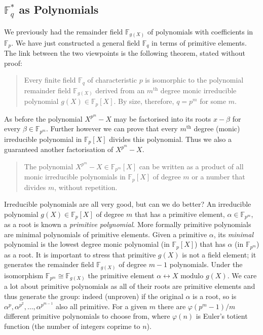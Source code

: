 \documentclass[twocolumn]{revtex4-2}
\begin{document}
\subsection{$\mathbb{F}_q^*$ as Polynomials}
We previously had the remainder field $\mathbb{F}_{g(X)}$ of polynomials with coefficients in $\mathbb{F}_p$. We have just constructed a general field $\mathbb{F}_q$ in terms of primitive elements.
The link between the two viewpoints is the following theorem, stated without proof:
\begin{quote}
Every finite field $\mathbb{F}_q$ of characteristic $p$ is isomorphic to the polynomial remainder field $\mathbb{F}_{g(X)}$ derived from an $m^{\text{th}}$ degree monic irreducible polynomial $g(X) \in \mathbb{F}_p[X]$.
By size, therefore, $q = p^m$ for some $m$.
\end{quote}
As before the polynomial $X^{p^m} - X$ may be factorised into its roots $x-\beta$ for every $\beta \in \mathbb{F}_{p^m}$. 
Further however we can prove that every $m^{\text{th}}$ degree (monic) irreducible polynomial in $\mathbb{F}_p[X]$ divides this polynomial. Thus we also a guaranteed another factorisation of $X^{p^m}-X$.
\begin{quote}
The polynomial $X^{p^m}-X \in \mathbb{F}_{p^m}[X]$ can be written as a product of all monic irreducible polynomials in $\mathbb{F}_p[X]$ of degree $m$ or a number that divides $m$, without repetition.
\end{quote}
Irreducible polynomials are all very good, but can we do better? An irreducible polynomial $g(X) \in \mathbb{F}_p[X]$ of degree $m$ that has a primitive element, $\alpha \in \mathbb{F}_{p^m}$, as a root is known a \emph{primitive polynomial}.
More formally primitive polynomials are minimal polynomials of primitive elements. Given a primitive $\alpha$, its \emph{minimal} polynomial is the lowest degree monic polynomial (in $\mathbb{F}_p[X]$) that has $\alpha$ (in $\mathbb{F}_{p^m}$) as a root.
It is important to stress that primitive $g(X)$ is not a field element; it generates the remainder field $\mathbb{F}_{g(X)}$ of degree $m-1$ polynomials. Under the isomorphism $\mathbb{F}_{p^m} \cong \mathbb{F}_{g(X)}$ the primitive element $\alpha \longleftrightarrow X \text{ modulo }g(X)$.
We care a lot about primitive polynomials as all of their roots are primitive elements and thus generate the group: indeed (unproven) if the original $\alpha$ is a root, so is $\alpha^p, \alpha^{p^2}, \ldots , \alpha^{p^{m-1}}$ also all primitive.
For a given $m$ there are $\varphi(p^m - 1)/m$ different primitive polynomials to choose from, where $\varphi(n)$ is Euler's totient function (the number of integers coprime to $n$).
\end{document}
